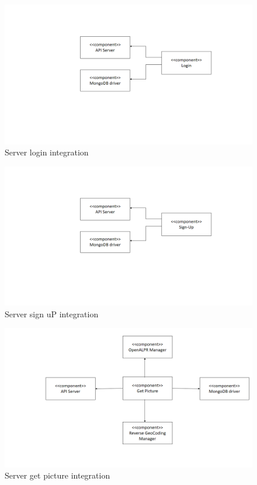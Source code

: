 \begin{figure}[H]
\centering
\includegraphics[width=\textwidth]{Images/ServerLoginIntegration.png}
\caption{\label{fig:ServerLoginIntegration}Server login integration}
\end{figure}

\begin{figure}[H]
\centering
\includegraphics[width=\textwidth]{Images/ServerSignUPIntegration.png}
\caption{\label{fig:ServerSignUPIntegration}Server sign uP integration}
\end{figure}

\begin{figure}[H]
\centering
\includegraphics[width=\textwidth]{Images/ServerGetPicIntegration.png}
\caption{\label{fig:ServerGetPicIntegration} Server get picture integration}
\end{figure}

